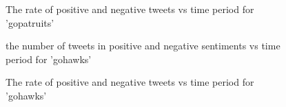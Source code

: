 \documentclass{article}
\begin{document}
\begin{figure}
\centering
{}
\caption{The rate of positive and negative tweets vs time period for 'gopatruits'} \label{fig:q16_22}
\end{figure}

\begin{figure}
\centering
{}
\caption{the number of tweets in positive and negative sentiments vs time period for 'gohawks'} \label{fig:q16_23}
\end{figure}

\begin{figure}
\centering
{}
\caption{The rate of positive and negative tweets vs time period for 'gohawks'} \label{fig:q16_24}
\end{figure}
\end{document}
